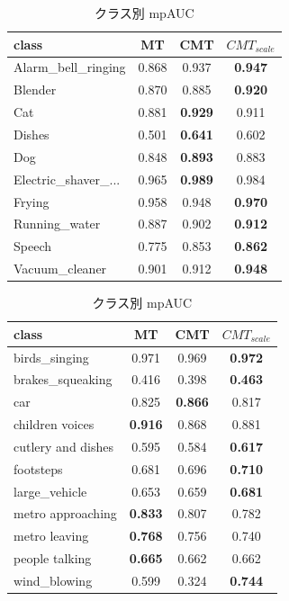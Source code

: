 \documentclass[main]{subfiles}
\begin{document}
 \begin{table}[htbp]
  \centering
  \small
  \begin{minipage}[t]{0.48\textwidth}
    \centering
    \begin{tabular}{|l|c|c|c|}
    \hline
    class & MT & CMT & $CMT_{scale}$  \\
    \hline
    Alarm\_bell\_ringing & 0.868 & 0.937 & \textbf{0.947} \\
    Blender & 0.870 & 0.885 & \textbf{0.920} \\
    Cat & 0.881 & \textbf{0.929} & 0.911 \\
    Dishes & 0.501 & \textbf{0.641} & 0.602 \\
    Dog & 0.848 & \textbf{0.893} & 0.883 \\
    Electric\_shaver\_... & 0.965 & \textbf{0.989} & 0.984 \\
    Frying & 0.958 & 0.948 & \textbf{0.970} \\
    Running\_water & 0.887 & 0.902 & \textbf{0.912} \\
    Speech & 0.775 & 0.853 & \textbf{0.862} \\
    Vacuum\_cleaner & 0.901 & 0.912 & \textbf{0.948} \\
    \hline
    \end{tabular}
    \caption{クラス別 PSDS}
    \label{table:classWise-PSDS}
  \end{minipage}
  \hfill
  \begin{minipage}[t]{0.48\textwidth}
    \centering
    \begin{tabular}{|l|c|c|c|}
    \hline
    class & MT & CMT & $CMT_{scale}$  \\
    \hline
    birds\_singing & 0.971 & 0.969 & \textbf{0.972} \\
    brakes\_squeaking & 0.416 & 0.398 & \textbf{0.463} \\
    car & 0.825 & \textbf{0.866} & 0.817 \\
    children voices & \textbf{0.916} & 0.868 & 0.881 \\
    cutlery and dishes & 0.595 & 0.584 & \textbf{0.617} \\
    footsteps & 0.681 & 0.696 & \textbf{0.710} \\
    large\_vehicle & 0.653 & 0.659 & \textbf{0.681} \\
    metro approaching & \textbf{0.833} & 0.807 & 0.782 \\
    metro leaving & \textbf{0.768} & 0.756 & 0.740 \\
    people talking & \textbf{0.665} & 0.662 & 0.662 \\
    wind\_blowing & 0.599 & 0.324 & \textbf{0.744} \\
    \hline
    \end{tabular}
    \caption{クラス別 mpAUC}
    \label{table:classWise-mpAUC}
  \end{minipage}
\end{table}
 
\end{document}
